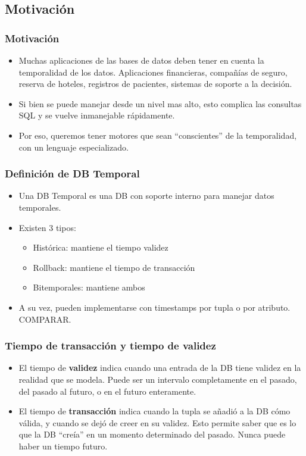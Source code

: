 \subsection{Motivación}

\begin{frame}
	\frametitle{Motivación}
	\begin{itemize}
	\item	Muchas aplicaciones de las bases de datos deben tener
		en cuenta la temporalidad de los datos. \pause
		Aplicaciones financieras, compañías de seguro, reserva
		de hoteles, registros de pacientes, sistemas de soporte
		a la decisión. \pause

	\item	Si bien se puede manejar desde un nivel mas alto, esto
		complica las consultas SQL y se vuelve inmanejable rápidamente.
		\pause

	\item	Por eso, queremos tener motores que sean ``conscientes'' de
		la temporalidad, con un lenguaje especializado.
	\end{itemize}
\end{frame}

\begin{frame}
\frametitle{Definición de DB Temporal}
	\begin{itemize}
	\item	Una DB Temporal es una DB con soporte interno para manejar
		datos temporales. \pause

	\item	Existen 3 tipos: \pause
		\begin{itemize}
		\item Histórica: mantiene el tiempo validez \pause
		\item Rollback: mantiene el tiempo de transacción \pause
		\item Bitemporales: mantiene ambos \pause
		\end{itemize}

	\item	A su vez, pueden implementarse con timestamps por tupla
		o por atributo. COMPARAR.
	\end{itemize}
\end{frame}

\begin{frame}
\frametitle{Tiempo de transacción y tiempo de validez}
	\begin{itemize}
	\item	El tiempo de {\bf validez} indica cuando una entrada de la DB
		tiene validez en la realidad que se modela. \pause Puede
		ser un intervalo completamente en el pasado, del pasado al
		futuro, o en el futuro enteramente.
	\pause
	\item	El tiempo de {\bf transacción} indica cuando la tupla se añadió
		a la DB cómo válida, y cuando se dejó de creer en su validez.
		\pause Esto permite saber que es lo que la DB ``creía'' en
		un momento determinado del pasado.
		\pause Nunca puede haber un tiempo futuro.
	\end{itemize}
\end{frame}

